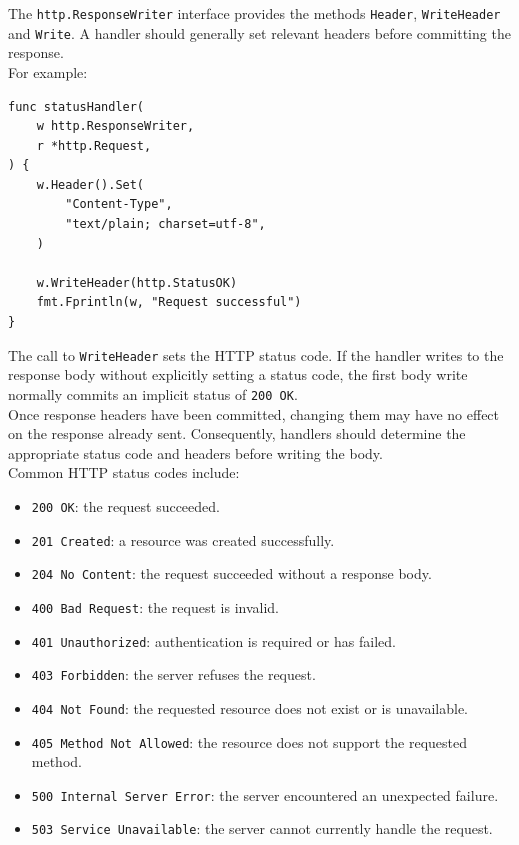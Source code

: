 The \texttt{http.ResponseWriter} interface provides the methods \texttt{Header}, \texttt{WriteHeader} and \texttt{Write}. A handler should generally set relevant headers before committing the response.\\

For example:

\begin{lstlisting}
func statusHandler(
    w http.ResponseWriter,
    r *http.Request,
) {
    w.Header().Set(
        "Content-Type",
        "text/plain; charset=utf-8",
    )

    w.WriteHeader(http.StatusOK)
    fmt.Fprintln(w, "Request successful")
}
\end{lstlisting}

The call to \texttt{WriteHeader} sets the HTTP status code. If the handler writes to the response body without explicitly setting a status code, the first body write normally commits an implicit status of \texttt{200 OK}.\\

Once response headers have been committed, changing them may have no effect on the response already sent. Consequently, handlers should determine the appropriate status code and headers before writing the body.\\

Common HTTP status codes include:

\begin{itemize}
    \item \texttt{200 OK}: the request succeeded.
    \item \texttt{201 Created}: a resource was created successfully.
    \item \texttt{204 No Content}: the request succeeded without a response body.
    \item \texttt{400 Bad Request}: the request is invalid.
    \item \texttt{401 Unauthorized}: authentication is required or has failed.
    \item \texttt{403 Forbidden}: the server refuses the request.
    \item \texttt{404 Not Found}: the requested resource does not exist or is unavailable.
    \item \texttt{405 Method Not Allowed}: the resource does not support the requested method.
    \item \texttt{500 Internal Server Error}: the server encountered an unexpected failure.
    \item \texttt{503 Service Unavailable}: the server cannot currently handle the request.
\end{itemize}

